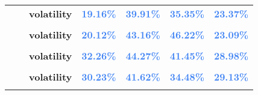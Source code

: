 \documentclass[
  authoryear,
  preprint,
  3p]{elsarticle}
\begin{document}
\begin{longtable}[t]{>{}l>{}l>{}l>{}r>{}r>{}r>{}r}
\textbf{} & \textbf{} & \textbf{volatility} & \textcolor[HTML]{4285f4}{\textbf{19.16\%}} & \textcolor[HTML]{4285f4}{\textbf{39.91\%}} & \textcolor[HTML]{4285f4}{\textbf{35.35\%}} & \textcolor[HTML]{4285f4}{\textbf{23.37\%}}\\
\addlinespace
\textbf{\cellcolor{gray!10}{}} & \textbf{\cellcolor{gray!10}{contango}} & \textbf{\cellcolor{gray!10}{mean}} & \textcolor[HTML]{4285f4}{\textbf{\cellcolor{gray!10}{-0.09\%}}} & \textcolor[HTML]{4285f4}{\textbf{\cellcolor{gray!10}{*46.48\%}}} & \textcolor[HTML]{4285f4}{\textbf{\cellcolor{gray!10}{12.65\%}}} & \textcolor[HTML]{4285f4}{\textbf{\cellcolor{gray!10}{-13.41\%}}}\\
\textbf{} & \textbf{} & \textbf{volatility} & \textcolor[HTML]{4285f4}{\textbf{20.12\%}} & \textcolor[HTML]{4285f4}{\textbf{43.16\%}} & \textcolor[HTML]{4285f4}{\textbf{46.22\%}} & \textcolor[HTML]{4285f4}{\textbf{23.09\%}}\\
\textbf{\cellcolor{gray!10}{Nickel-primary (XLME)}} & \textbf{\cellcolor{gray!10}{whole period}} & \textbf{\cellcolor{gray!10}{mean}} & \textcolor[HTML]{4285f4}{\textbf{\cellcolor{gray!10}{19.31\%}}} & \textcolor[HTML]{4285f4}{\textbf{\cellcolor{gray!10}{12.5\%}}} & \textcolor[HTML]{4285f4}{\textbf{\cellcolor{gray!10}{3.52\%}}} & \textcolor[HTML]{4285f4}{\textbf{\cellcolor{gray!10}{0.31\%}}}\\
\textbf{} & \textbf{} & \textbf{volatility} & \textcolor[HTML]{4285f4}{\textbf{32.26\%}} & \textcolor[HTML]{4285f4}{\textbf{44.27\%}} & \textcolor[HTML]{4285f4}{\textbf{41.45\%}} & \textcolor[HTML]{4285f4}{\textbf{28.98\%}}\\
\textbf{\cellcolor{gray!10}{}} & \textbf{\cellcolor{gray!10}{backwardation}} & \textbf{\cellcolor{gray!10}{mean}} & \textcolor[HTML]{4285f4}{\textbf{\cellcolor{gray!10}{23.25\%}}} & \textcolor[HTML]{4285f4}{\textbf{\cellcolor{gray!10}{-39.24\%}}} & \textcolor[HTML]{4285f4}{\textbf{\cellcolor{gray!10}{16.3\%}}} & \textcolor[HTML]{4285f4}{\textbf{\cellcolor{gray!10}{**35.09\%}}}\\
\addlinespace
\textbf{} & \textbf{} & \textbf{volatility} & \textcolor[HTML]{4285f4}{\textbf{30.23\%}} & \textcolor[HTML]{4285f4}{\textbf{41.62\%}} & \textcolor[HTML]{4285f4}{\textbf{34.48\%}} & \textcolor[HTML]{4285f4}{\textbf{29.13\%}}\\
\textbf{\cellcolor{gray!10}{}} & \textbf{\cellcolor{gray!10}{contango}} & \textbf{\cellcolor{gray!10}{mean}} & \textcolor[HTML]{4285f4}{\textbf{\cellcolor{gray!10}{15.46\%}}} & \textcolor[HTML]{4285f4}{\textbf{\cellcolor{gray!10}{**63.47\%}}} & \textcolor[HTML]{4285f4}{\textbf{\cellcolor{gray!10}{-7.67\%}}} & \textcolor[HTML]{4285f4}{\textbf{\cellcolor{gray!10}{**-34.64\%}}}\\

\end{longtable}
\end{document}
